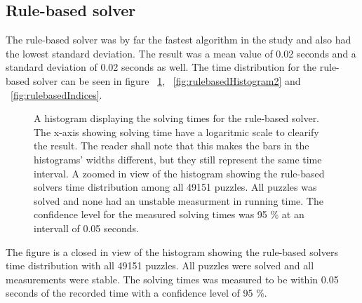 \documentclass[a4paper,11pt]{kth-mag}
\begin{document}
\FloatBarrier
\subsection{Rule-based solver}
The rule-based solver was by far the fastest algorithm in the study and also had the lowest standard deviation. 
The result was a mean value of 0.02 seconds and a standard deviation of 0.02 seconds as well. 
The time distribution for the rule-based solver can be seen in 
figure ~\ref{fig:rulebasedHistogram}, ~\ref{fig:rulebasedHistogram2} and ~\ref{fig:rulebasedIndices}.

\begin{figure}[here] 
\noindent{}
\caption{A histogram displaying the solving times for the rule-based solver. The x-axis showing solving time have a logaritmic scale to clearify the result. The reader shall note that this makes the bars in the histograms' widths different, but they still represent the same time interval.
A zoomed in view of the histogram showing the rule-based solvers time distribution among all 49151 puzzles. All puzzles was solved and none had an unstable measurment in running time. The confidence level for the measured solving times was 95 \% at an intervall of 0.05 seconds.}
\label{fig:rulebasedHistogram}
\end{figure}

The figure is a closed in view of the histogram showing the rule-based solvers time distribution with all 49151 puzzles. 
All puzzles were solved and all measurements were stable. The solving times was measured to be within 0.05 seconds of the recorded time with a confidence level of 95 \%. 
\end{document}
